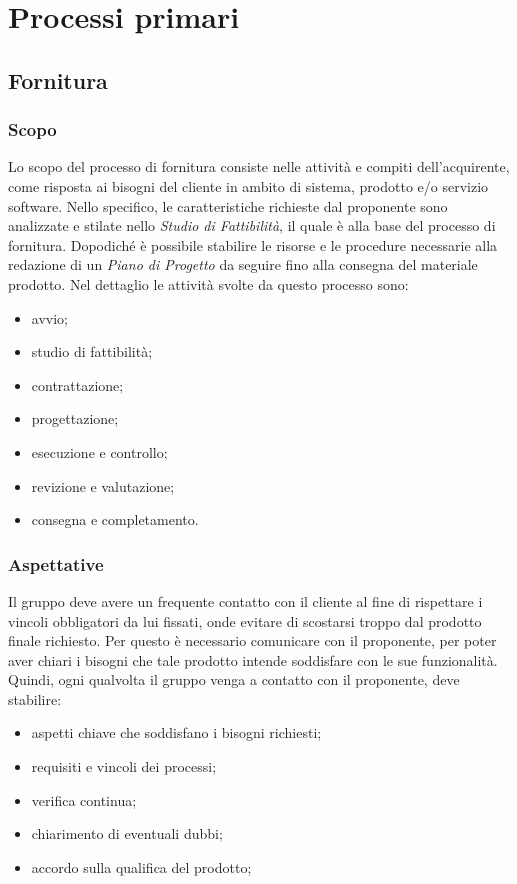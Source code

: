 \section{Processi primari}
	\subsection{Fornitura}
		\subsubsection{Scopo}
		Lo scopo del processo di fornitura consiste nelle attività e compiti dell'acquirente, come risposta ai bisogni del cliente in ambito di sistema, prodotto e/o servizio software. Nello specifico, le caratteristiche richieste dal proponente sono analizzate e stilate nello \textit{Studio di Fattibilità}, il quale è alla base del processo di fornitura. Dopodiché è possibile stabilire le risorse e le procedure necessarie alla redazione di un \textit{Piano di Progetto} da seguire fino alla consegna del materiale prodotto.
		Nel dettaglio le attività svolte da questo processo sono:
		\begin{itemize}
			\item avvio;
			\item studio di fattibilità;
			\item contrattazione;
			\item progettazione;
			\item esecuzione e controllo;
			\item revizione e valutazione;
			\item consegna e completamento.
		\end{itemize}
		\subsubsection{Aspettative}
		Il gruppo deve avere un frequente contatto con il cliente al fine di rispettare i vincoli obbligatori da lui fissati, onde evitare di scostarsi troppo dal prodotto finale richiesto. Per questo è necessario comunicare con il proponente, per poter aver chiari i bisogni che tale prodotto intende soddisfare con le sue funzionalità.
		Quindi, ogni qualvolta il gruppo venga a contatto con il proponente, deve stabilire:
		\begin{itemize}
			\item aspetti chiave che soddisfano i bisogni richiesti;
			\item requisiti e vincoli dei processi;
			\item verifica continua;
			\item chiarimento di eventuali dubbi;
			\item accordo sulla qualifica del prodotto;
			\end{itemize} 
